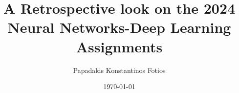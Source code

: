 \documentclass{beamer}
\title{A Retrospective look on the 2024 Neural Networks-Deep Learning Assignments}
\author{Papadakis Konstantinos Fotios}
\date{\today}
\begin{document}
\frame{\titlepage}






\end{document}
